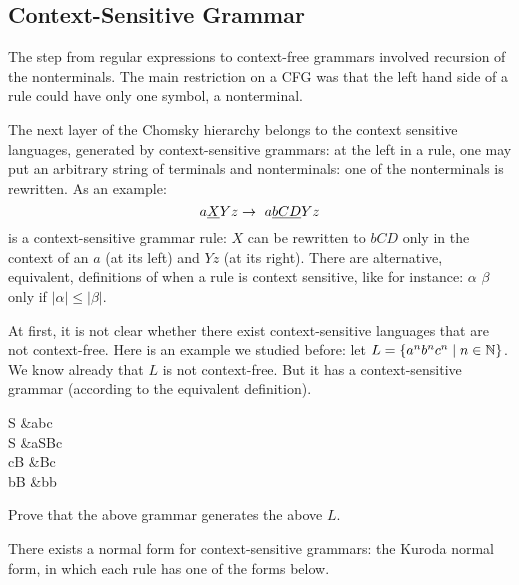 





\subsection{Context-Sensitive Grammar}

The step from regular expressions to context-free grammars involved
recursion of the nonterminals. The main restriction on a CFG was that
the left hand side of a rule could have only one symbol, a nonterminal.

The next layer of the Chomsky hierarchy belongs to the context
sensitive languages, generated by context-sensitive grammars: at the
left in a rule, one may put an arbitrary string of terminals and
nonterminals: one of the nonterminals is rewritten. As an example:
\begin{equation*}
	a\underline{X}Yz \rightarrow~ a\underline{bCD}Yz
\end{equation*}
is a context-sensitive grammar rule: $X$ can be rewritten to $bCD$ only in
the context of an $a$ (at its left) and $Yz$ (at its right). There are
alternative, equivalent, definitions of when a rule is context
sensitive, like for instance: $\alpha$ \rpijl $\beta$ only if
$|\alpha| \leq |\beta|$.\label{altdefcs}

At first, it is not clear whether there exist context-sensitive
languages that are not context-free. Here is an example we studied
before: let $L = \{a^nb^nc^n\mid n \in \mathbb{N}\}$. We know already that $L$ is
not context-free. But it has a context-sensitive grammar (according to
the equivalent definition).

\begin{grammar}
S &\rpijl abc \\
S &\rpijl aSBc \\
cB &\rpijl  Bc \\
bB &\rpijl  bb
\end{grammar}

\begin{exercise}
Prove that the above grammar generates the above $L$.
\end{exercise}

There exists a normal form for context-sensitive grammars: the Kuroda
normal form, in which each rule has one of the forms below.


